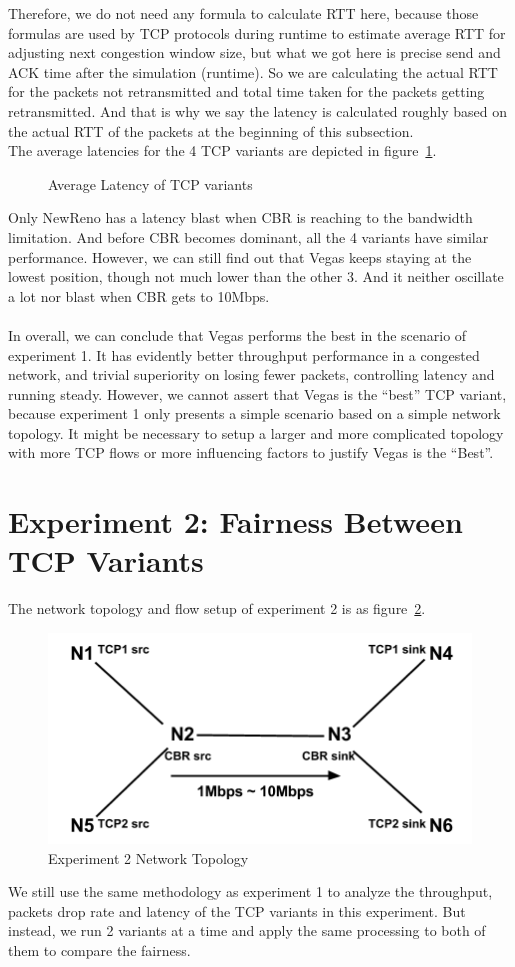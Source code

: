 \documentclass[10pt, conference]{lib/IEEEtran}
\begin{document}
Therefore, we do not need any formula to calculate RTT here, because those formulas are used by TCP protocols 
during runtime to estimate average RTT for adjusting next congestion window size, but what we got here is 
precise send and ACK time after the simulation (runtime). So we are calculating the actual RTT for the packets 
not retransmitted and total time taken for the packets getting retransmitted. And that is why we say the latency 
is calculated roughly based on the actual RTT of the packets at the beginning of this subsection.\\
The average latencies for the 4 TCP variants are depicted in figure~\ref{fig:exp1_lt}.
\begin{figure}[!htb]
    \centering
    \resizebox{0.9\linewidth}{!}{}
    \caption{Average Latency of TCP variants}
    \label{fig:exp1_lt}
\end{figure}
Only NewReno has a latency blast when CBR is reaching to the bandwidth limitation. And before CBR becomes dominant, 
all the 4 variants have similar performance. However, we can still find out that Vegas keeps staying at the lowest 
position, though not much lower than the other 3. And it neither oscillate a lot nor blast when CBR gets to 10Mbps.\\\\
In overall, we can conclude that Vegas performs the best in the scenario of experiment 1. It has evidently better 
throughput performance in a congested network, and trivial superiority on losing fewer packets, controlling latency 
and running steady. However, we cannot assert that Vegas is the ``best'' TCP variant, because experiment 1 only presents 
a simple scenario based on a simple network topology. It might be necessary to setup a larger and more complicated 
topology with more TCP flows or more influencing factors to justify Vegas is the ``Best''.


\section{Experiment 2: Fairness Between TCP Variants}
The network topology and flow setup of experiment 2 is as figure~\ref{fig:exp2_tpg}.
\begin{figure}[!htb]
    \centering
    \includegraphics[width=0.8\linewidth]{images/exp2-tpg.png}
    \caption{Experiment 2 Network Topology}
    \label{fig:exp2_tpg}
\end{figure}
We still use the same methodology as experiment 1 to analyze the throughput, packets drop rate and latency of the 
TCP variants in this experiment. But instead, we run 2 variants at a time and apply the same processing to both of 
them to compare the fairness.
\end{document}

